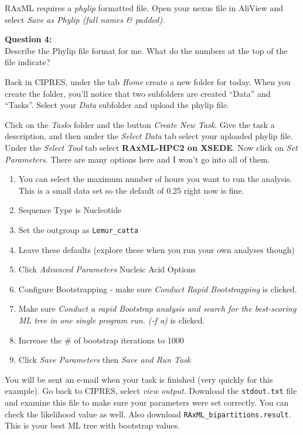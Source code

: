 \documentclass[11pt]{article}
\begin{document}
RAxML requires a \textit{phylip} formatted file. Open your nexus file
in AliView and select \textit{Save as Phylip (full names \& padded)}.

\begin{framed}
\noindent
\textbf{Question 4:} \\
Describe the Phylip file format for me.  What do the numbers at the top of the file indicate?
\end{framed}


Back in CIPRES, under the tab \textit{Home} create a new folder for today.  
When you create the folder, you’ll notice that two subfolders are created ``Data'' and ``Tasks''.
Select your \textit{Data} subfolder and upload the phylip file.

Click on the \textit{Tasks} folder and the button \textit{Create New Task}.
Give the task a description, and then
under the \textit{Select Data} tab select your uploaded phylip file.
Under the \textit{Select Tool} tab select \textbf{RAxML-HPC2 on XSEDE}.
Now click on \textit{Set Parameters}. There are many options here and I won't go into all of them.  

\begin{enumerate}
\item  You can select the maximum number of hours you want to run the analysis. This is a small data set so the default of 0.25 right now is fine.
\item  Sequence Type is Nucleotide
\item  Set the outgroup as \texttt{Lemur\_catta}
\item  Leave these defaults (explore these when you run your own analyses though)
\item  Click \textit{Advanced Parameters} Nucleic Acid Options
\item  Configure Bootstrapping - make sure \textit{Conduct Rapid Bootstrapping} is clicked.
\item  Make sure \textit{Conduct a rapid Bootstrap analysis and search for the best-scoring ML tree in one single program run. (-f a)} is clicked.
\item Increase the \# of bootstrap iterations to 1000
\item Click \textit{Save Parameters} then \textit{Save and Run Task}
\end{enumerate}

You will be sent an e-mail when your task is finished (very quickly for this example).  Go back to CIPRES, select \textit{view output}.  
Download the \texttt{stdout.txt} file and examine this file to make sure your parameters were set correctly.  
You can check the likelihood value as well.  
Also download \texttt{RAxML\_bipartitions.result}.  
This is your best ML tree with bootstrap values.
\end{document}
